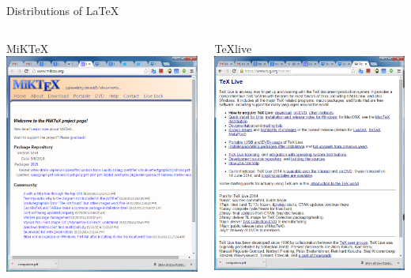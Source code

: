 \documentclass{beamer}
\begin{document}
\begin{frame}{Distributions of \LaTeX}

     \begin{columns}[t]
     \begin{column}[T]{5cm}
      MiKTeX 
     \includegraphics[scale=0.15,trim = 0mm 0mm 00mm 0mm]{../figs/MiKText.png}      
     \end{column}
     \begin{column}[T]{5cm} %
      TeXlive 
      \includegraphics[scale=0.15,trim = 0mm 0mm 00mm 0mm]{../figs/TeXLive.png}         

\end{column}
\end{columns}
\end{frame}
\end{document}
